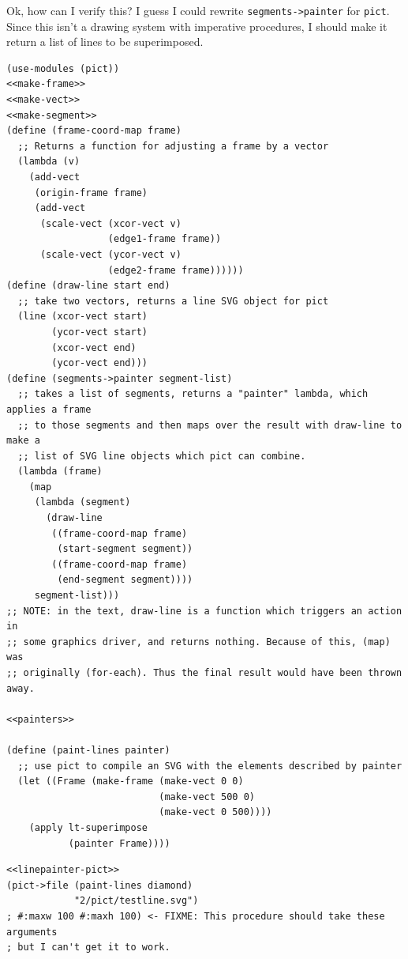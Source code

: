 \documentclass[final,fleqn,titlepage,twoside]{article}
\begin{document}
Ok, how can I verify this? I guess I could rewrite \texttt{segments->painter}
for \texttt{pict}. Since this isn't a drawing system with imperative
procedures, I should make it return a list of lines to be superimposed.
\begin{verbatim}
(use-modules (pict))
<<make-frame>>
<<make-vect>>
<<make-segment>>
(define (frame-coord-map frame)
  ;; Returns a function for adjusting a frame by a vector
  (lambda (v)
    (add-vect
     (origin-frame frame)
     (add-vect 
      (scale-vect (xcor-vect v)
                  (edge1-frame frame))
      (scale-vect (ycor-vect v)
                  (edge2-frame frame))))))
(define (draw-line start end)
  ;; take two vectors, returns a line SVG object for pict
  (line (xcor-vect start)
        (ycor-vect start)
        (xcor-vect end)
        (ycor-vect end)))
(define (segments->painter segment-list)
  ;; takes a list of segments, returns a "painter" lambda, which applies a frame
  ;; to those segments and then maps over the result with draw-line to make a
  ;; list of SVG line objects which pict can combine.
  (lambda (frame)
    (map
     (lambda (segment)
       (draw-line
        ((frame-coord-map frame)
         (start-segment segment))
        ((frame-coord-map frame)
         (end-segment segment))))
     segment-list)))
;; NOTE: in the text, draw-line is a function which triggers an action in
;; some graphics driver, and returns nothing. Because of this, (map) was
;; originally (for-each). Thus the final result would have been thrown away.

<<painters>>

(define (paint-lines painter)
  ;; use pict to compile an SVG with the elements described by painter
  (let ((Frame (make-frame (make-vect 0 0)
                           (make-vect 500 0)
                           (make-vect 0 500))))
    (apply lt-superimpose
           (painter Frame))))
\end{verbatim}
\begin{verbatim}
<<linepainter-pict>>
(pict->file (paint-lines diamond)
            "2/pict/testline.svg")
; #:maxw 100 #:maxh 100) <- FIXME: This procedure should take these arguments
; but I can't get it to work.
\end{verbatim}
\end{document}
